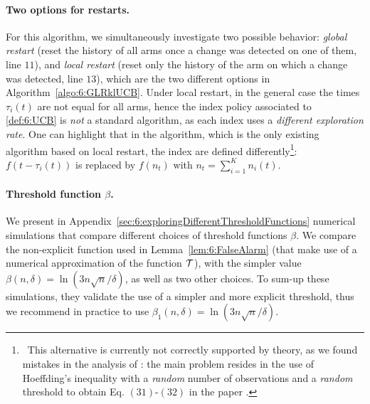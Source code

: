 \paragraph{Two options for restarts.}
%
For this algorithm, we simultaneously investigate two possible behavior: \emph{global restart} (reset the history of all arms once a change was detected on one of them, line $11$), and \emph{local restart} (reset only the history of the arm on which a change was detected, line $13$), which are the two different options in Algorithm~\ref{algo:6:GLRklUCB}.
%
Under local restart, in the general case the times $\tau_i(t)$ are not equal for all arms, hence the index policy associated to \eqref{def:6:UCB} is \emph{not} a standard \UCB{} algorithm, as each index uses a \emph{different exploration rate}.
%
One can highlight that in the \CUSUMUCB{} algorithm, which is the only existing algorithm based on local restart, the \UCB{} index are defined differently\footnote{~This alternative is currently not correctly supported by theory, as we found mistakes in the analysis of \CUSUMUCB: the main problem resides in the use of Hoeffding's inequality with a \emph{random} number of observations and a \emph{random} threshold to obtain Eq. $(31)$-$(32)$ in the paper \cite{LiuLeeShroff17}.}:
$f(t-\tau_i(t))$ is replaced by $f(n_t)$ with $n_t = \sum_{i=1}^K n_i(t)$.


\paragraph{Threshold function $\beta$.}

We present in Appendix~\ref{sec:6:exploringDifferentThresholdFunctions} numerical simulations that compare different choices of threshold functions $\beta$.
We compare the non-explicit function used in Lemma~\ref{lem:6:FalseAlarm} (that make use of a numerical approximation of the function $\mathcal{T}$),
with the simpler value $\beta(n,\delta) = \ln(3n\sqrt{n}/\delta)$, as well as two other choices.
To sum-up these simulations, they validate the use of a simpler and more explicit threshold, thus we recommend in practice to use $\beta_1(n,\delta) = \ln(3n\sqrt{n}/\delta)$.



